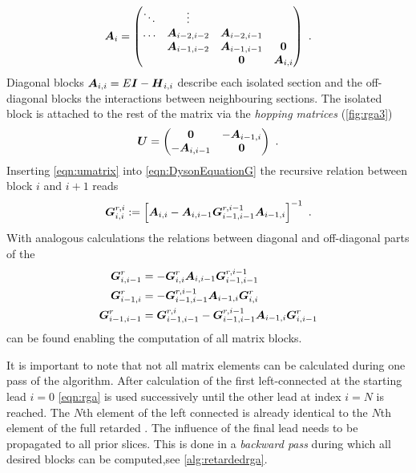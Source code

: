 \begin{align}
\boldsymbol{A}_i = 
\begin{pmatrix}
\ddots 	& \vdots 	   & 		   & \\
\dots   & \boldsymbol{A}_{i-2,i-2}&\boldsymbol{A}_{i-2,i-1}& \\
     	& \boldsymbol{A}_{i-1,i-2}  &\boldsymbol{A}_{i-1,i-1}  & \boldsymbol{0} \\ 
	&  		   & \boldsymbol{0} 	   & \boldsymbol{A}_{i,i}
\end{pmatrix}\ .
\end{align}
Diagonal blocks $\boldsymbol{A}_{i,i} = E\boldsymbol{I}-\boldsymbol{H}_{i,i}$ describe each isolated section and the off-diagonal blocks the interactions between neighbouring sections. The isolated block is attached to the rest of the matrix via the \emph{hopping matrices} (\cref{fig:rga3})
\begin{align}
\boldsymbol{U} = 
\begin{pmatrix}
\boldsymbol{0}& -\boldsymbol{A}_{i-1,i}\\
-\boldsymbol{A}_{i,i-1}&\boldsymbol{0}
\end{pmatrix}\ .
\label{eqn:umatrix}
\end{align}
Inserting \cref{eqn:umatrix} into \cref{eqn:DysonEquationG} the recursive relation between block $i$ and $i+1$ reads 
\begin{align}
\mat{G}^{r,i}_{i,i} := \left[\mat{A}_{i,i}-\mat{A}_{i,i-1}\mat{G}^{r,i-1}_{i-1,i-1}\mat{A}_{i-1,i}\right]^{-1}\ .
\label{eqn:rga}
\end{align}
With analogous calculations the relations between diagonal and off-diagonal parts  of the \gfnc{} 
\begin{align}
\boldsymbol{G}^r_{i,i-1} &= -\boldsymbol{G}^r_{i,i}\boldsymbol{A}_{i,i-1}\boldsymbol{G}^{r,i-1}_{i-1,i-1}\\
\boldsymbol{G}^r_{i-1,i} &= -\boldsymbol{G}^{r,i-1}_{i-1,i-1}\boldsymbol{A}_{i-1,i} \boldsymbol{G}^{r}_{i,i}\\
\boldsymbol{G}^r_{i-1,i-1} &= \boldsymbol{G}^{r,i}_{i-1,i-1}-\boldsymbol{G}^{r,i-1}_{i-1,i-1}\boldsymbol{A}_{i-1,i}\boldsymbol{G}^{r}_{i,i-1}
\end{align}
can be found enabling the computation of all matrix blocks.\par
It is important to note that not all matrix elements can be calculated during one pass of the algorithm. After calculation of the first left-connected \gfnc{} at the starting lead $i=0$ \cref{eqn:rga} is used successively until the other lead at index $i=N$ is reached. The $N$th element of the left connected \gfnc{} is already identical to the $N$th element of the full retarded \gfnc{}. The influence of the final lead needs to be propagated to all prior slices. This is done in a \emph{backward pass} during which all desired blocks can be computed,see \cref{alg:retardedrga}.\par
